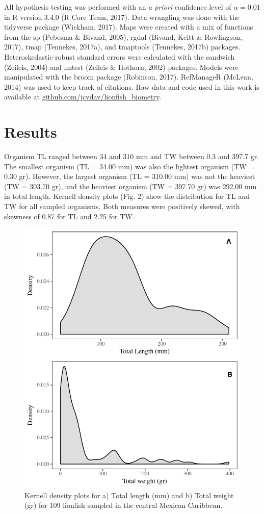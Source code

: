 \documentclass[12pt,]{article}
\begin{document}
All hypothesis testing was performed with an \emph{a priori} confidence
level of \(\alpha = 0.01\) in R version 3.4.0 (R Core Team, 2017). Data
wrangling was done with the tidyverse package (Wickham, 2017). Maps were
created with a mix of functions from the sp (Pebesma \& Bivand, 2005),
rgdal (Bivand, Keitt \& Rowlingson, 2017), tmap (Tennekes, 2017a), and
tmaptools (Tennekes, 2017b) packages. Heteroskedastic-robust standard
errors were calculated with the sandwich (Zeileis, 2004) and lmtest
(Zeileis \& Hothorn, 2002) packages. Models were manipulated with the
broom package (Robinson, 2017). RefManageR (McLean, 2014) was used to
keep track of citations. Raw data and code used in this work is
available at \url{github.com/jcvdav/lionfish_biometry}.

\section{Results}\label{results}

Organism TL ranged between 34 and 310 mm and TW between 0.3 and 397.7
gr. The smallest organism (TL = 34.00 mm) was also the lightest organism
(TW = 0.30 gr). However, the largest organism (TL = 310.00 mm) was not
the heaviest (TW = 303.70 gr), and the heaviest organism (TW = 397.70
gr) was 292.00 mm in total length. Kernell density plots (Fig. 2) show
the distribution for TL and TW for all sampled organisms. Both measures
were positively skewed, with skewness of 0.87 for TL and 2.25 for TW.

\begin{figure}[htbp]
\centering
\includegraphics{Manuscript_files/figure-latex/histogram figures-1.pdf}
\caption{Kernell density plots for a) Total length (mm) and b) Total
weight (gr) for 109 lionfish sampled in the central Mexican Caribbean.}
\end{figure}
\end{document}

